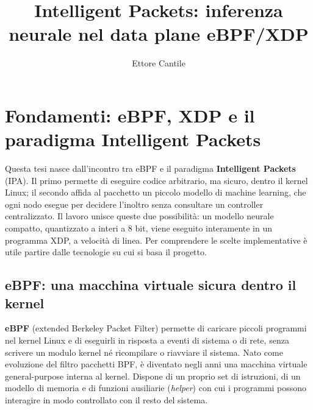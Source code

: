 \documentclass[binding=0.6cm,italian,oneside,noexaminfo]{sapthesis}
\title{Intelligent Packets: inferenza neurale nel data plane eBPF/XDP}
\author{Ettore Cantile}
\begin{document}
\setlength{\parindent}{0pt}

\frontmatter
\maketitle

\tableofcontents

\mainmatter

\chapter{Fondamenti: eBPF, XDP e il paradigma Intelligent Packets}
\label{ch:fondamenti}

Questa tesi nasce dall'incontro tra eBPF e il paradigma \textbf{Intelligent Packets} (IPA). Il primo permette di eseguire codice arbitrario, ma sicuro, dentro il kernel Linux; il secondo affida al pacchetto un piccolo modello di machine learning, che ogni nodo esegue per decidere l'inoltro senza consultare un controller centralizzato. Il lavoro unisce queste due possibilità: un modello neurale compatto, quantizzato a interi a 8 bit, viene eseguito interamente in un programma XDP, a velocità di linea. Per comprendere le scelte implementative è utile partire dalle tecnologie su cui si basa il progetto.

\section{eBPF: una macchina virtuale sicura dentro il kernel}

\textbf{eBPF} (extended Berkeley Packet Filter) permette di caricare piccoli programmi nel kernel Linux e di eseguirli in risposta a eventi di sistema o di rete, senza scrivere un modulo kernel né ricompilare o riavviare il sistema. Nato come evoluzione del filtro pacchetti BPF, è diventato negli anni una macchina virtuale general-purpose interna al kernel. Dispone di un proprio set di istruzioni, di un modello di memoria e di funzioni ausiliarie (\emph{helper}) con cui i programmi possono interagire in modo controllato con il resto del sistema.
\end{document}
